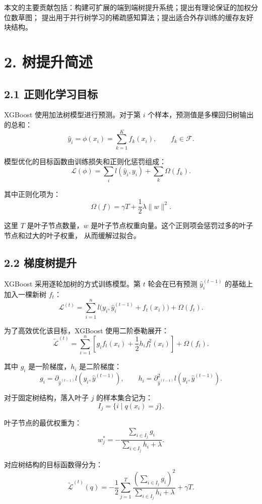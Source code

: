 本文的主要贡献包括：构建可扩展的端到端树提升系统；提出有理论保证的加权分位数草图；
提出用于并行树学习的稀疏感知算法；提出适合外存训练的缓存友好块结构。

\section{2. 树提升简述}

\subsection{2.1 正则化学习目标}

XGBoost 使用加法树模型进行预测。对于第 $i$ 个样本，预测值是多棵回归树输出的总和：
\[
  \hat{y}_i=\phi(x_i)=\sum_{k=1}^{K}f_k(x_i),\qquad f_k\in\mathcal{F}.
\]

模型优化的目标函数由训练损失和正则化惩罚组成：
\[
  \mathcal{L}(\phi)=\sum_i l(\hat{y}_i,y_i)+\sum_k\Omega(f_k).
\]

其中正则化项为：
\[
  \Omega(f)=\gamma T+\frac{1}{2}\lambda \lVert w\rVert^2.
\]

这里 $T$ 是叶子节点数量，$w$ 是叶子节点权重向量。这个正则项会惩罚过多的叶子节点和过大的叶子权重，
从而缓解过拟合。

\subsection{2.2 梯度树提升}

XGBoost 采用逐轮加树的方式训练模型。第 $t$ 轮会在已有预测
$\hat{y}_i^{(t-1)}$ 的基础上加入一棵新树 $f_t$：
\[
  \mathcal{L}^{(t)}
  =
  \sum_{i=1}^{n}
  l\bigl(y_i,\hat{y}_i^{(t-1)}+f_t(x_i)\bigr)
  +
  \Omega(f_t).
\]

为了高效优化该目标，XGBoost 使用二阶泰勒展开：
\[
  \tilde{\mathcal{L}}^{(t)}
  =
  \sum_{i=1}^{n}
  \left[
    g_i f_t(x_i)+\frac{1}{2}h_i f_t^2(x_i)
  \right]
  +
  \Omega(f_t).
\]

其中 $g_i$ 是一阶梯度，$h_i$ 是二阶梯度：
\[
  g_i=\partial_{\hat{y}^{(t-1)}}l(y_i,\hat{y}^{(t-1)}),
  \qquad
  h_i=\partial^2_{\hat{y}^{(t-1)}}l(y_i,\hat{y}^{(t-1)}).
\]

对于固定树结构，落入叶子 $j$ 的样本集合记为：
\[
  I_j=\{i\mid q(x_i)=j\}.
\]

叶子节点的最优权重为：
\[
  w_j^*
  =
  -
  \frac{\sum_{i\in I_j}g_i}
       {\sum_{i\in I_j}h_i+\lambda}.
\]

对应树结构的目标函数得分为：
\[
  \tilde{\mathcal{L}}^{(t)}(q)
  =
  -
  \frac{1}{2}
  \sum_{j=1}^{T}
  \frac{\left(\sum_{i\in I_j}g_i\right)^2}
       {\sum_{i\in I_j}h_i+\lambda}
  +
  \gamma T.
\]

